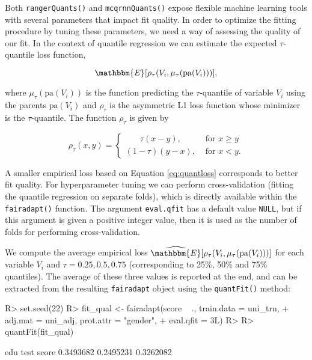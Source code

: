 \documentclass[
  nojss]{jss}
\begin{document}
Both \texttt{rangerQuants()} and \texttt{mcqrnnQuants()} expose flexible
machine learning tools with several parameters that impact fit quality.
In order to optimize the fitting procedure by tuning these parameters,
we need a way of assessing the quality of our fit. In the context of
quantile regression we can estimate the expected \(\tau\)-quantile loss
function,

\begin{equation}
\label{eq:quantloss}
\mathbbm{E}[\rho_{\tau}(V_i, \mu_{\tau}(\mathrm{pa}(V_i)))],
\end{equation}

where \(\mu_{\tau}(\mathrm{pa}(V_i))\) is the function predicting the
\(\tau\)-quantile of variable \(V_i\) using the parents
\(\mathrm{pa}(V_i)\) and \(\rho_{\tau}\) is the asymmetric L1 loss
function whose minimizer is the \(\tau\)-quantile. The function
\(\rho_{\tau}\) is given by

\[
\rho_{\tau}(x, y) = \begin{cases}
                      \phantom{( )}\tau(x-y), & \text{ for } x \geq y\\
                      (1-\tau)(y-x), & \text{ for } x < y.
                    \end{cases}
\]

A smaller empirical loss based on Equation \eqref{eq:quantloss}
corresponds to better fit quality. For hyperparameter tuning we can
perform cross-validation (fitting the quantile regression on separate
folds), which is directly available within the \texttt{fairadapt()}
function. The argument \texttt{eval.qfit} has a default value
\texttt{NULL}, but if this argument is given a positive integer value,
then it is used as the number of folds for performing cross-validation.

We compute the average empirical loss
\(\widehat{\mathbbm{E}} [\rho_{\tau} (V_i, \mu_{\tau}(\mathrm{pa}(V_i)))]\)
for each variable \(V_i\) and \(\tau = 0.25, 0.5, 0.75\) (corresponding
to 25\%, 50\% and 75\% quantiles). The average of these three values is
reported at the end, and can be extracted from the resulting
\texttt{fairadapt} object using the \texttt{quantFit()} method:

\begin{CodeChunk}
\begin{CodeInput}
R> set.seed(22)
R> fit_qual <- fairadapt(score ~ ., train.data = uni_trn,
+                       adj.mat = uni_adj, prot.attr = "gender",
+                       eval.qfit = 3L)
R> 
R> quantFit(fit_qual)
\end{CodeInput}
\begin{CodeOutput}
      edu      test     score 
0.3493682 0.2495231 0.3262082 
\end{CodeOutput}
\end{CodeChunk}
\end{document}
